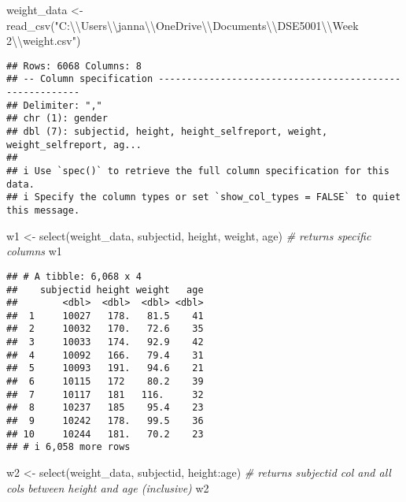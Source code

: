 \documentclass[
]{article}
\newenvironment{Shaded}{\begin{snugshade}}{\end{snugshade}}
\newcommand{\CommentTok}[1]{\textcolor[rgb]{0.56,0.35,0.01}{\textit{#1}}}
\newcommand{\FunctionTok}[1]{\textcolor[rgb]{0.00,0.00,0.00}{#1}}
\newcommand{\NormalTok}[1]{#1}
\newcommand{\OtherTok}[1]{\textcolor[rgb]{0.56,0.35,0.01}{#1}}
\newcommand{\SpecialCharTok}[1]{\textcolor[rgb]{0.00,0.00,0.00}{#1}}
\newcommand{\StringTok}[1]{\textcolor[rgb]{0.31,0.60,0.02}{#1}}
\begin{document}
\begin{Shaded}
\begin{Highlighting}[]
\NormalTok{weight\_data }\OtherTok{\textless{}{-}} \FunctionTok{read\_csv}\NormalTok{(}\StringTok{"C:}\SpecialCharTok{\textbackslash{}\textbackslash{}}\StringTok{Users}\SpecialCharTok{\textbackslash{}\textbackslash{}}\StringTok{janna}\SpecialCharTok{\textbackslash{}\textbackslash{}}\StringTok{OneDrive}\SpecialCharTok{\textbackslash{}\textbackslash{}}\StringTok{Documents}\SpecialCharTok{\textbackslash{}\textbackslash{}}\StringTok{DSE5001}\SpecialCharTok{\textbackslash{}\textbackslash{}}\StringTok{Week 2}\SpecialCharTok{\textbackslash{}\textbackslash{}}\StringTok{weight.csv"}\NormalTok{)}
\end{Highlighting}
\end{Shaded}

\begin{verbatim}
## Rows: 6068 Columns: 8
## -- Column specification --------------------------------------------------------
## Delimiter: ","
## chr (1): gender
## dbl (7): subjectid, height, height_selfreport, weight, weight_selfreport, ag...
## 
## i Use `spec()` to retrieve the full column specification for this data.
## i Specify the column types or set `show_col_types = FALSE` to quiet this message.
\end{verbatim}

\begin{Shaded}
\begin{Highlighting}[]
\NormalTok{w1 }\OtherTok{\textless{}{-}} \FunctionTok{select}\NormalTok{(weight\_data, subjectid, height, weight, age) }\CommentTok{\# returns specific columns}
\NormalTok{w1}
\end{Highlighting}
\end{Shaded}

\begin{verbatim}
## # A tibble: 6,068 x 4
##    subjectid height weight   age
##        <dbl>  <dbl>  <dbl> <dbl>
##  1     10027   178.   81.5    41
##  2     10032   170.   72.6    35
##  3     10033   174.   92.9    42
##  4     10092   166.   79.4    31
##  5     10093   191.   94.6    21
##  6     10115   172    80.2    39
##  7     10117   181   116.     32
##  8     10237   185    95.4    23
##  9     10242   178.   99.5    36
## 10     10244   181.   70.2    23
## # i 6,058 more rows
\end{verbatim}

\begin{Shaded}
\begin{Highlighting}[]
\NormalTok{w2 }\OtherTok{\textless{}{-}} \FunctionTok{select}\NormalTok{(weight\_data, subjectid, height}\SpecialCharTok{:}\NormalTok{age) }\CommentTok{\# returns subjectid col and all cols between height and age (inclusive)}
\NormalTok{w2}
\end{Highlighting}
\end{Shaded}
\end{document}

